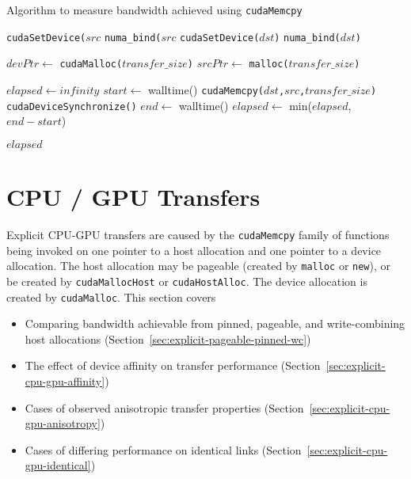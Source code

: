 \begin{algorithm}
    \caption{Algorithm to measure bandwidth achieved using \texttt{cudaMemcpy}}
    \label{alg:explicit-cpu-cpu}
    \begin{algorithmic}[1]
    \Statex
            \State \texttt{cudaSetDevice($src$}
        \Else {}
            \State \texttt{numa\_bind($src$}
        \EndIf
        \State \texttt{cudaSetDevice($dst$)}
        \Else {}
        \State \texttt{numa\_bind($dst$)}
        \EndIf

        \State $devPtr \gets$ \texttt{cudaMalloc($transfer\_size$)} 
        \State $srcPtr \gets$ \texttt{malloc($transfer\_size$)} 

        \State $elapsed \gets infinity$ 
            \State $start \gets$ walltime()
            \State \texttt{cudaMemcpy($dst$,$src$,$transfer\_size$)}
            \State \texttt{cudaDeviceSynchronize()}
            \State $end \gets$ walltime()
            \State $elapsed \gets$ min($elapsed$, $end-start$)
        \EndFor

        \Return $elapsed$
    \EndFunction

    \end{algorithmic}
\end{algorithm}



\section{CPU / GPU Transfers}
\label{sec:explicit-cpu-gpu}

Explicit CPU-GPU transfers are caused by the \texttt{cudaMemcpy} family of functions being invoked on one pointer to a host allocation and one pointer to a device allocation.
The host allocation may be pageable (created by \texttt{malloc} or \texttt{new}), or be created by \texttt{cudaMallocHost} or \texttt{cudaHostAlloc}.
The device allocation is created by \texttt{cudaMalloc}.
This section covers
\begin{itemize}
\item Comparing bandwidth achievable from pinned, pageable, and write-combining host allocations (Section~\ref{sec:explicit-pageable-pinned-wc})
\item The effect of device affinity on transfer performance (Section~\ref{sec:explicit-cpu-gpu-affinity})
\item Cases of observed anisotropic transfer properties (Section~\ref{sec:explicit-cpu-gpu-anisotropy})
\item Cases of differing performance on identical links (Section~\ref{sec:explicit-cpu-gpu-identical})
\end{itemize}

